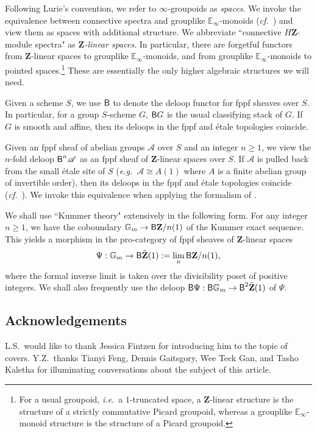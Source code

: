 \documentclass[10pt,english,reqno]{amsart}
\newcommand{\integers}{\mathbf Z}
\newcommand{\deloop}{\textnormal{\textsf{B}}}
\theoremstyle{definition}
\numberwithin{equation}{section}
\begin{document}
Following Lurie's convention, we refer to $\infty$-groupoids as \emph{spaces}. We invoke the equivalence between connective spectra and grouplike $\mathbb E_{\infty}$-monoids (\emph{cf.}~\cite[Remark 5.2.6.26]{lurie2017higher}) and view them as spaces with additional structure. We abbreviate ``connective $H\integers$-module spectra" as \emph{$\integers$-linear spaces}. In particular, there are forgetful functors from $\integers$-linear spaces to grouplike $\mathbb E_{\infty}$-monoids, and from grouplike $\mathbb E_{\infty}$-monoids to pointed spaces.\footnote{For a usual groupoid, \emph{i.e.}~a $1$-truncated space, a $\integers$-linear structure is the structure of a strictly commutative Picard groupoid, whereas a grouplike $\mathbb E_{\infty}$-monoid structure is the structure of a Picard groupoid.} These are essentially the only higher algebraic structures we will need.

Given a scheme $S$, we use $\deloop$ to denote the deloop functor for fppf sheaves over $S$. In particular, for a group $S$-scheme $G$, $\deloop G$ is the usual classifying stack of $G$. If $G$ is smooth and affine, then its deloops in the fppf and \'etale topologies coincide.

Given an fppf sheaf of abelian groups $\mathscr A$ over $S$ and an integer $n\ge 1$, we view the $n$-fold deloop $\deloop^n\mathscr A$ as an fppf sheaf of $\integers$-linear spaces over $S$. If $\mathscr A$ is pulled back from the small \'etale site of $S$ (\emph{e.g.}~$\mathscr A\cong A(1)$ where $A$ is a finite abelian group of invertible order), then its deloops in the fppf and \'etale topologies coincide (\emph{cf.}~\cite[0DDT]{stacks-project}). We invoke this equivalence when applying the formalism of \cite{zhao2022metaplectic}.

We shall use ``Kummer theory" extensively in the following form. For any integer $n\ge 1$, we have the coboundary $\mathbb G_m \rightarrow \deloop \integers/n(1)$ of the Kummer exact sequence. This yields a morphism in the pro-category of fppf sheaves of $\integers$-linear spaces
$$
\Psi : \mathbb G_m \rightarrow \deloop \hat{\integers}(1) := \lim_n \deloop \integers/n(1),
$$
where the formal inverse limit is taken over the divisibility poset of positive integers. We shall also frequently use the deloop $\deloop\Psi : \deloop\mathbb G_m \rightarrow \deloop^2\hat{\integers}(1)$ of $\Psi$.


\subsection{Acknowledgements}
L.S.~would like to thank Jessica Fintzen for introducing him to the topic of covers. Y.Z.~thanks Tianyi Feng, Dennis Gaitsgory, Wee Teck Gan, and Tasho Kaletha for illuminating conversations about the subject of this article.
\end{document}
